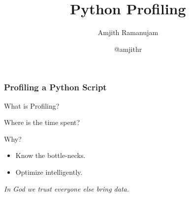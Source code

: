 \documentclass[c,english]{beamer}
\providecommand*{\DUroletitlereference}[1]{\textsl{#1}}
\begin{document}
\title[Python Profiling]{Python Profiling%
  \label{python-profiling}}
\author[Amjith Ramanujam]{Amjith Ramanujam}
\date{@amjithr}
\maketitle















\begin{frame}[fragile]
\frametitle{Profiling a Python Script}


\begin{block}{ What is Profiling? }

Where is the time spent?

\end{block}

\pause

\begin{block}{ Why? }
\begin{itemize}

\item Know the bottle-necks.

\item Optimize intelligently.
\end{itemize}

\end{block}

\DUroletitlereference{In God we trust everyone else bring data.}
\end{frame}
\end{document}
